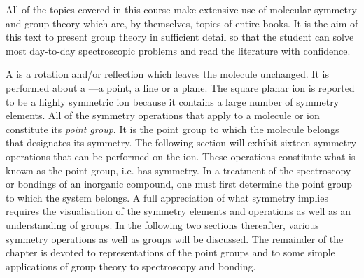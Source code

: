 All of the topics covered in this course make extensive use of molecular symmetry and group theory which are, by themselves, topics of entire books.
It is the aim of this text to present group theory in sufficient detail so that the student can solve most day-to-day spectroscopic problems and read the literature with confidence.

A  is a rotation and/or reflection which leaves the molecule unchanged. 
It is performed about a ---a point, a line or a plane.
The square planar  ion is reported to be a highly symmetric ion because it contains a large number of symmetry elements.
All of the symmetry operations that apply to a molecule or ion constitute its \textit{point group}.
It is the point group to which the molecule belongs that designates its symmetry.
The following section will exhibit sixteen symmetry operations that can be performed on the  ion. 
These operations constitute what is known as the  point group, i.e.  has  symmetry.
In a treatment of the spectroscopy or bondings of an inorganic compound, one must first determine the point group to which the system belongs.
A full appreciation of what  symmetry implies requires the visualisation of the symmetry elements and operations as well as an understanding of groups.
In the following two sections thereafter, various symmetry operations as well as groups will be discussed.
The remainder of the chapter is devoted to representations of the point groups and to some simple applications of group theory to spectroscopy and bonding.






